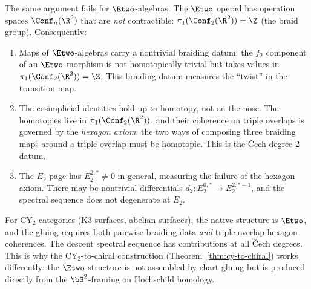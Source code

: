 \begin{remark}
\label{rem:e2-descent-obstructed}
The same argument fails for $\Etwo$-algebras. The $\Etwo$ operad has operation spaces $\Conf_n(\R^2)$ that are \emph{not} contractible: $\pi_1(\Conf_2(\R^2)) = \Z$ (the braid group). Consequently:
\begin{enumerate}[label=(\roman*)]
 \item Maps of $\Etwo$-algebras carry a nontrivial braiding datum: the $f_2$ component of an $\Etwo$-morphism is not homotopically trivial but takes values in $\pi_1(\Conf_2(\R^2)) = \Z$. This braiding datum measures the ``twist'' in the transition map.
 \item The cosimplicial identities hold up to homotopy, not on the nose. The homotopies live in $\pi_1(\Conf_2(\R^2))$, and their coherence on triple overlaps is governed by the \emph{hexagon axiom}: the two ways of composing three braiding maps around a triple overlap must be homotopic. This is the \v{C}ech degree $2$ datum.
 \item The $E_2$-page has $E_2^{2,*} \neq 0$ in general, measuring the failure of the hexagon axiom. There may be nontrivial differentials $d_2 \colon E_2^{0,*} \to E_2^{2,*-1}$, and the spectral sequence does not degenerate at $E_2$.
\end{enumerate}
For CY$_2$ categories (K3 surfaces, abelian surfaces), the native structure is $\Etwo$, and the gluing requires both pairwise braiding data \emph{and} triple-overlap hexagon coherences. The descent spectral sequence has contributions at all \v{C}ech degrees. This is why the CY$_2$-to-chiral construction (Theorem~\ref{thm:cy-to-chiral}) works differently: the $\Etwo$ structure is not assembled by chart gluing but is produced directly from the $\bS^2$-framing on Hochschild homology.
\end{remark}

